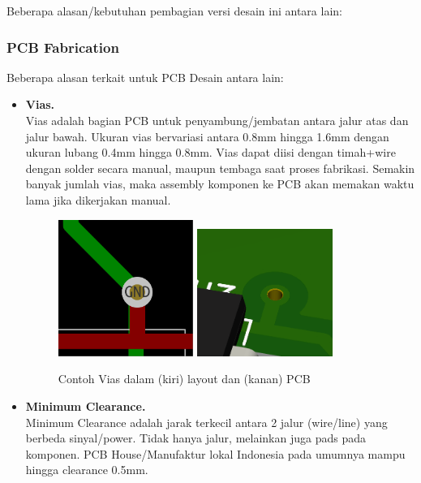 \documentclass[12pt,]{article}
\begin{document}
	Beberapa alasan/kebutuhan pembagian versi desain ini antara lain:
	
	\subsubsection{PCB Fabrication}
	
	Beberapa alasan terkait untuk PCB Desain antara lain:
	\begin{itemize}
		\item \textbf{Vias.}\\
		Vias adalah bagian PCB untuk penyambung/jembatan antara jalur atas dan jalur bawah.
		Ukuran vias bervariasi antara 0.8mm hingga 1.6mm dengan ukuran lubang 0.4mm hingga 0.8mm.
		Vias dapat diisi dengan timah+wire dengan solder secara manual, maupun tembaga saat proses fabrikasi.
		Semakin banyak jumlah vias, maka assembly komponen ke PCB akan memakan waktu lama jika dikerjakan manual.
		
		\begin{figure}[!ht]
			\centering
			\includegraphics[width=125pt]{images/vias_layout}
			\includegraphics[width=125pt]{images/vias_pcb}
			\caption{Contoh Vias dalam (kiri) layout dan (kanan) PCB}
		\end{figure}
	
		\item \textbf{Minimum Clearance.}\\
		Minimum Clearance adalah jarak terkecil antara 2 jalur (wire/line) yang berbeda sinyal/power.
		Tidak hanya jalur, melainkan juga pads pada komponen.
		PCB House/Manufaktur lokal Indonesia pada umumnya mampu hingga clearance 0.5mm.
		

\end{itemize}
\end{document}
